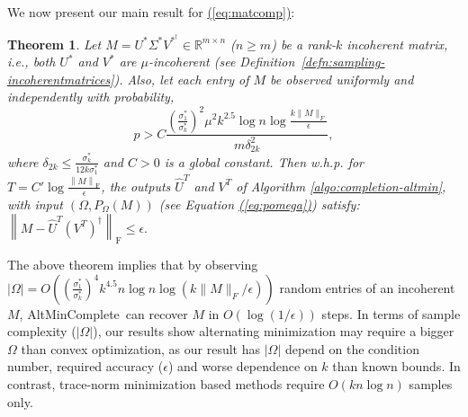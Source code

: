 \documentclass[11pt]{article}
\renewcommand{\eqref}[1]{\hyperref[#1]{(\ref*{#1})}}
\theoremstyle{plain}
\newtheorem{theorem}{Theorem}[section]
\theoremstyle{definition}
\newcommand{\dist}{\mathrm{dist}}
\newcommand{\frob}[1]{\left\| {#1} \right\|_\text{F}}
\newcommand{\calA}{\mathcal{A}}
\newcommand{\aff}{{\mathcal A}}
\newcommand{\so}{\sigma^*}
\newcommand{\amc}{AltMinComplete\ }
\begin{document}
We now present our main result for \eqref{eq:matcomp}:
\begin{theorem}\label{thm:sampling-altmin-main}
Let $M=U^*\Sigma^*V^{*^\dag } \in \mathbb{R}^{m\times n}$ ($n\geq m$) be a rank-$k$ incoherent matrix, i.e., both $U^*$ and $V^*$ are $\mu$-incoherent (see Definition~\ref{defn:sampling-incoherentmatrices}).  Also, let each entry of $M$ be observed uniformly and independently with probability, 
$$p>C\frac{\left(\frac{\sigma_1^*}{\sigma_k^*}\right)^2\mu^2k^{2.5}\log n \log \frac{k\|M\|_F}{\epsilon}}{m\delta_{2k}^2},$$
where $\delta_{2k}\leq \frac{\so_k}{12k\so_1}$ and $C>0$ is a global constant. 
 Then w.h.p. for $T = C'\log\frac{\frob{M}}{\epsilon}$, the outputs $\widehat{U}^{T}$ and $V^{T}$ of  Algorithm \ref{algo:completion-altmin}, with input $(\Omega, P_\Omega(M))$ (see Equation \eqref{eq:pomega}) satisfy: 
$  \frob{M - \widehat{U}^{T}\left(V^{T}\right)^{\dag}} \leq \epsilon.$
\end{theorem}
The above theorem implies that by observing $\left|\Omega\right|=O\left((\frac{\so_1}{\so_k})^4k^{4.5}n \log n\log(k\|M\|_F/\epsilon)\right)$ random entries of an incoherent $M$, \amc can recover $M$ in $O(\log(1/\epsilon))$ steps. In terms of sample complexity ($|\Omega|$), our results show alternating minimization may require a bigger $\Omega$ than convex optimization, as our result has $|\Omega|$ depend on the condition number, required accuracy ($\epsilon$) and worse dependence on $k$ than known  bounds. In contrast, trace-norm minimization based methods require $O(kn \log n)$ samples only. 
\end{document}
